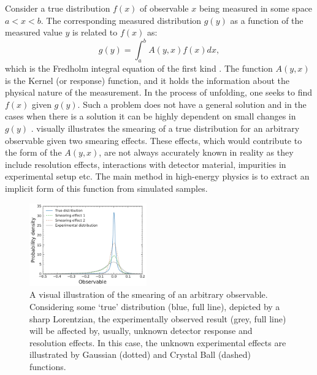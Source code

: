 Consider a true distribution $f(x)$ of observable $x$ being measured in some space $a<x<b$.
The corresponding measured distribution $g(y)$ as a function of the measured value $y$ is related to $f(x)$ as:
\begin{equation}\label{eq:fredholm_integral}
    g(y) =  \int_a^b A(y,x) f(x) dx,
\end{equation}
which is the Fredholm integral equation of the first kind \cite{Blobel_Lohrmann_1998}.
The function $A(y, x)$ is the Kernel (or response) function, and it holds the information about the physical nature of the measurement.
In the process of unfolding, one seeks to find $f(x)$ given $g(y)$.
Such a problem does not have a general solution and in the cases when there is a solution it can be highly dependent on small changes in $g(y)$ \cite{Delves_Walsh_1974}.
 visually illustrates the smearing of a true distribution for an arbitrary observable given two smearing effects.
These effects, which would contribute to the form of the $A(y,x)$, are not always accurately known in reality
as they include resolution effects, interactions with detector material, impurities in experimental setup etc.
The main method in high-energy physics is to extract an implicit form of this function from simulated samples.

\begin{figure}[htbp!]
    \centering
\includegraphics[width=0.45\textwidth]{figures/analysis_techniques/experimental_smearing.pdf}
\caption{\label{fig:smearing_illustration} 
A visual illustration of the smearing of an arbitrary observable.
Considering some `true' distribution (blue, full line), depicted by a sharp Lorentzian, the experimentally observed result (grey, full line) will be affected by, usually, unknown detector response and resolution effects.
In this case, the unknown experimental effects are illustrated by Gaussian (dotted) and Crystal Ball (dashed) functions.}
\end{figure}

